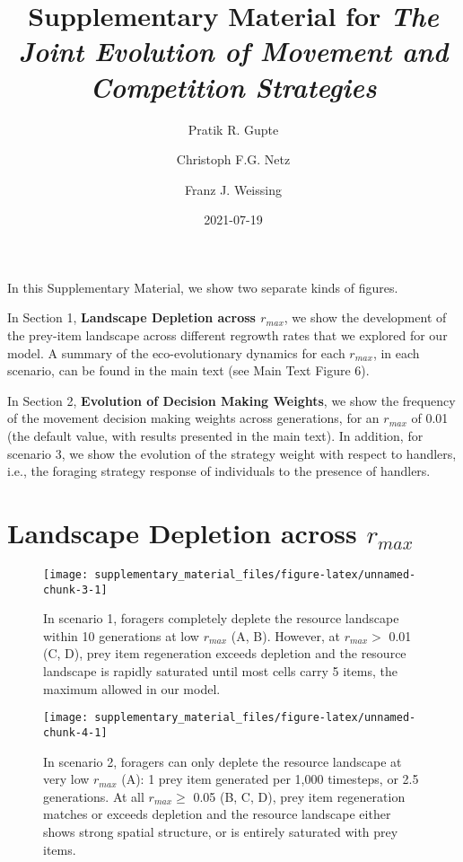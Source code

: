 \documentclass[
]{scrreprt}
\title{Supplementary Material for \emph{The Joint Evolution of Movement and Competition Strategies}}
\author{Pratik R. Gupte \and Christoph F.G. Netz \and Franz J. Weissing}
\date{2021-07-19}
\begin{document}
\maketitle

In this Supplementary Material, we show two separate kinds of figures.

In Section 1, \textbf{Landscape Depletion across \(r_{max}\)}, we show the development of the prey-item landscape across different regrowth rates that we explored for our model. A summary of the eco-evolutionary dynamics for each \(r_{max}\), in each scenario, can be found in the main text (see Main Text Figure 6).

In Section 2, \textbf{Evolution of Decision Making Weights}, we show the frequency of the movement decision making weights across generations, for an \(r_{max}\) of 0.01 (the default value, with results presented in the main text). In addition, for scenario 3, we show the evolution of the strategy weight with respect to handlers, i.e., the foraging strategy response of individuals to the presence of handlers.

\hypertarget{landscape-depletion-across-r_max}{%
\chapter{\texorpdfstring{Landscape Depletion across \(r_{max}\)}{Landscape Depletion across r\_\{max\}}}\label{landscape-depletion-across-r_max}}

\begin{figure}

{\centering \texttt{[image: supplementary\_material\_files/figure-latex/unnamed-chunk-3-1]} 

}

\caption{In scenario 1, foragers completely deplete the resource landscape within 10 generations at low $r_{max}$ (A, B). However, at $r_{max} >$ 0.01 (C, D), prey item regeneration exceeds depletion and the resource landscape is rapidly saturated until most cells carry 5 items, the maximum allowed in our model.}\label{fig:unnamed-chunk-3}
\end{figure}

\begin{figure}

{\centering \texttt{[image: supplementary\_material\_files/figure-latex/unnamed-chunk-4-1]} 

}

\caption{In scenario 2, foragers can only deplete the resource landscape at very low $r_{max}$ (A): 1 prey item generated per 1,000 timesteps, or 2.5 generations. At all $r_{max} \geq$ 0.05 (B, C, D), prey item regeneration matches or exceeds depletion and the resource landscape either shows strong spatial structure, or is entirely saturated with prey items.}\label{fig:unnamed-chunk-4}
\end{figure}
\end{document}
